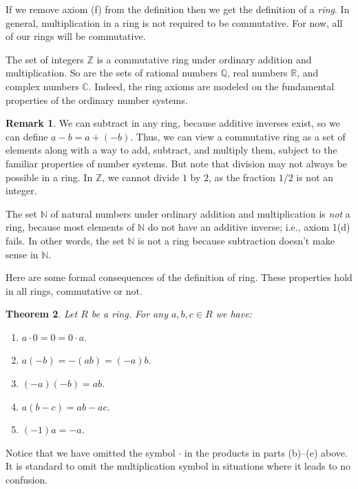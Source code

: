 \documentclass[11pt]{article}
\newtheorem{thm}{Theorem}[section]
\theoremstyle{definition}
\newtheorem{rmk}[thm]{Remark}
\newcommand{\R}{\mathbb{R}} %
\newcommand{\C}{\mathbb{C}} %
\newcommand{\Z}{\mathbb{Z}} %
\newcommand{\Q}{\mathbb{Q}} %
\newcommand{\N}{\mathbb{N}} %
\begin{document}
If we remove axiom (f) from the definition then we get the definition
of a \emph{ring}. In general, multiplication in a ring is not required
to be commutative. For now, all of our rings will be commutative.

The set of integers $\Z$ is a commutative ring under ordinary addition
and multiplication.  So are the sets of rational numbers $\Q$, real
numbers $\R$, and complex numbers $\C$.  Indeed, the ring axioms are
modeled on the fundamental properties of the ordinary number systems.

\begin{rmk}
  We can subtract in any ring, because additive inverses exist, so we
  can define $a-b = a+(-b)$. Thus, we can view a commutative ring as a
  set of elements along with a way to add, subtract, and multiply
  them, subject to the familiar properties of number systems. But note
  that division may not always be possible in a ring. In $\Z$, we
  cannot divide $1$ by $2$, as the fraction $1/2$ is not an integer.
\end{rmk}


The set $\N$ of natural numbers under ordinary addition and
multiplication is \emph{not} a ring, because most elements of $\N$ do
not have an additive inverse; i.e., axiom 1(d) fails. In other words,
the set $\N$ is not a ring because subtraction doesn't make sense in
$\N$.

Here are some formal consequences of the definition of ring. These
properties hold in all rings, commutative or not.

\begin{thm} \label{thm:ring-basics} 
Let $R$ be a ring. For any $a,b,c \in R$ we have:
\begin{enumerate}
\item $a \cdot 0  = 0 = 0 \cdot a$.

\item $a(-b) = -(ab) = (-a)b$.

\item $(-a)(-b) = ab$.

\item $a(b-c) = ab - ac$.

\item $(-1)a = -a$.
\end{enumerate}
\end{thm}

Notice that we have omitted the symbol $\cdot$ in the products in
parts (b)--(e) above. It is standard to omit the multiplication symbol
in situations where it leads to no confusion.
\end{document}
